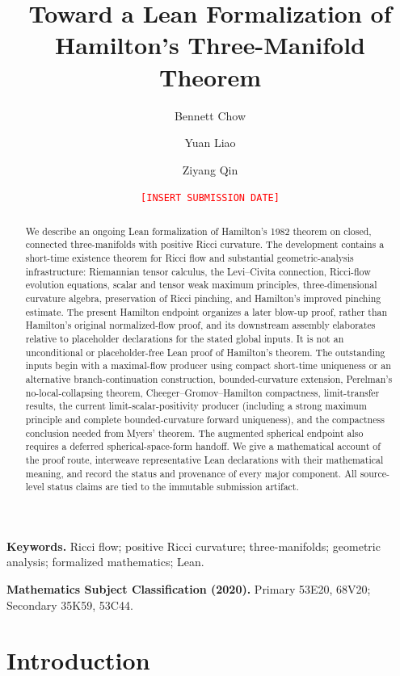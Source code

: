 \documentclass[11pt]{article}
\title{Toward a Lean Formalization of Hamilton's Three-Manifold Theorem}
\author{Bennett Chow \and Yuan Liao \and Ziyang Qin}
\date{\textcolor{red}{\texttt{[INSERT SUBMISSION DATE]}}}
\theoremstyle{plain}
\theoremstyle{definition}
\theoremstyle{remark}
\begin{document}
\maketitle

\begin{abstract}
We describe an ongoing Lean formalization of Hamilton's 1982 theorem on
closed, connected three-manifolds with positive Ricci curvature.  The
development contains a
short-time existence theorem for Ricci flow and substantial
geometric-analysis infrastructure: Riemannian tensor calculus, the
Levi--Civita connection, Ricci-flow evolution equations, scalar and tensor
weak maximum principles, three-dimensional curvature algebra, preservation
of Ricci pinching, and Hamilton's improved pinching estimate.  The present
Hamilton endpoint organizes a later blow-up proof, rather than Hamilton's
original normalized-flow proof, and its downstream assembly elaborates
relative to placeholder declarations for the stated global inputs.  It is not
an unconditional or placeholder-free Lean proof of Hamilton's theorem.  The
outstanding inputs begin with a maximal-flow producer using compact
short-time uniqueness or an alternative branch-continuation construction,
bounded-curvature extension, Perelman's no-local-collapsing
theorem, Cheeger--Gromov--Hamilton compactness, limit-transfer results, the
current limit-scalar-positivity producer (including a strong maximum principle
and complete bounded-curvature forward uniqueness), and the compactness
conclusion needed from Myers' theorem.  The augmented spherical endpoint also
requires a deferred spherical-space-form handoff.  We give a mathematical account of the proof
route, interweave representative Lean declarations with their mathematical
meaning, and record the status and provenance of every major component.  All
source-level status claims are tied to the immutable submission artifact.
\end{abstract}

\noindent\textbf{Keywords.}
Ricci flow; positive Ricci curvature; three-manifolds; geometric analysis;
formalized mathematics; Lean.

\medskip
\noindent\textbf{Mathematics Subject Classification (2020).}
Primary 53E20, 68V20; Secondary 35K59, 53C44.

\tableofcontents

\section{Introduction}
\end{document}
